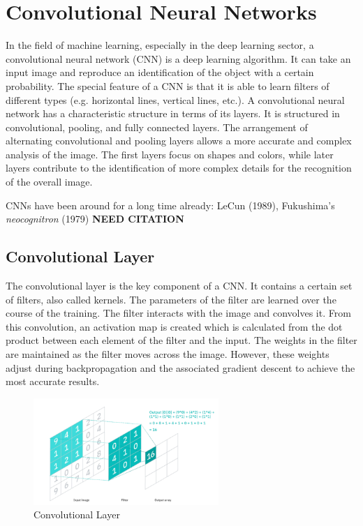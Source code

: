 \section{Convolutional Neural Networks}


In the field of machine learning, especially in the deep learning sector, a convolutional neural network (CNN) is a deep learning algorithm. It can take an input image and reproduce an identification of the object with a certain probability. The special feature of a CNN is that it is able to learn filters of different types (e.g. horizontal lines, vertical lines, etc.). A convolutional neural network has a characteristic structure in terms of its layers. It is structured in convolutional, pooling, and fully connected layers. The arrangement of alternating convolutional and pooling layers allows a more accurate and complex analysis of the image. The first layers focus on shapes and colors, while later layers contribute to the identification of more complex details for the recognition of the overall image.

CNNs have been around for a long time already: LeCun (1989), Fukushima's \emph{neocognitron} (1979) \textbf{NEED CITATION}


\subsection{Convolutional Layer}
The convolutional layer is the key component of a CNN. It contains a certain set of filters, also called kernels. The parameters of the filter are learned over the course of the training. The filter interacts with the image and convolves it. From this convolution, an activation map is created which is calculated from the dot product between each element of the filter and the input. The weights in the filter are maintained as the filter moves across the image. However, these weights adjust during backpropagation and the associated gradient descent to achieve the most accurate results. 

\begin{figure}[htb]
    \centering
    \includegraphics[width=7cm]{images/conv_layer.jpg}
    \caption{Convolutional Layer}
    \label{fig:convLayer}
\end{figure}


